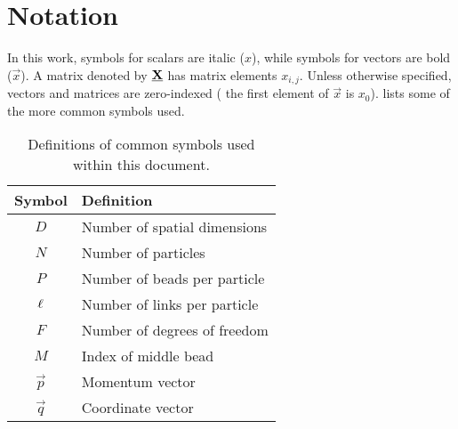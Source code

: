 \chapter{Notation}

In this work, symbols for scalars are italic ($x$), while symbols for vectors are bold ($\vec{x}$).
A matrix denoted by $\underline{\bm{\mathbf{X}}}$ has matrix elements $x_{i,j}$.
Unless otherwise specified, vectors and matrices are zero-indexed (\ie{} the first element of $\vec{x}$ is $x_0$).
 lists some of the more common symbols used.

\begin{table}[h]
	\renewcommand*\arraystretch{1.2}
	\begin{center}
	\begin{tabular}{ c l }
		\toprule
		Symbol & Definition \\
		\midrule
		$D$ & Number of spatial dimensions \\
		$N$ & Number of particles \\
		$P$ & Number of beads per particle \\
		$\ell$ & Number of links per particle \\
		$F$ & Number of degrees of freedom \\
		$M$ & Index of middle bead \\
		$\vec{p}$ & Momentum vector \\
		$\vec{q}$ & Coordinate vector \\
		\bottomrule
	\end{tabular}
	\end{center}
	\caption[
		Definitions of common symbols
	]{
		Definitions of common symbols used within this document.
	}
	\label{tab:symbols}
\end{table}

